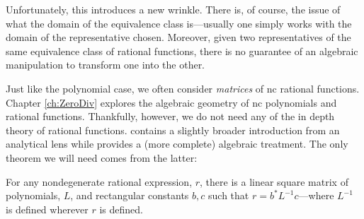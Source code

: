Unfortunately, this introduces a new wrinkle. There is, of course, the issue of
what the domain of the equivalence class is---usually one simply works with the
domain of the representative chosen. Moreover, given two representatives of the
same equivalence class of rational functions, there is no guarantee of an
algebraic manipulation to transform one into the other.

Just like the polynomial case, we often consider \emph{matrices} of nc rational
functions. Chapter \ref{ch:ZeroDiv} explores the algebraic geometry of nc
polynomials and rational functions. Thankfully, however, we do not
need any of the in depth theory of rational functions. \cite{heltonFree2013}
contains a slightly broader introduction from an analytical lens while \cite{cohnFree2006}
provides a (more complete) algebraic treatment. The only theorem we will need
comes from the latter:

\begin{theorem}
\label{thm:ratchar}
  For any nondegenerate
  rational expression, \(r\), there is a linear square matrix of polynomials, \(L\), and
  rectangular constants \(b,c\) such that \(r=b^*L ^{-1}c\)---where \(L ^{-1}\) is
  defined wherever \(r\) is defined.
\end{theorem}
